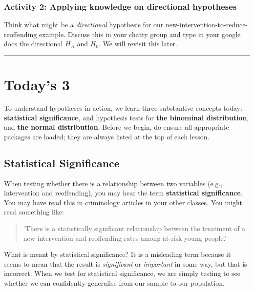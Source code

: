 \documentclass[
]{book}
\begin{document}
\hypertarget{activity-2-applying-knowledge-on-directional-hypotheses}{%
\subsubsection{Activity 2: Applying knowledge on directional hypotheses}\label{activity-2-applying-knowledge-on-directional-hypotheses}}

Think what might be a \emph{directional} hypothesis for our new-intervention-to-reduce-reoffending example. Discuss this in your chatty group and type in your google docs the directional \(H_A\) and \(H_0\). We will revisit this later.

\begin{center}\rule{0.5\linewidth}{0.5pt}\end{center}

\hypertarget{todays-3-3}{%
\section{Today's 3}\label{todays-3-3}}

To understand hypotheses in action, we learn three substantive concepts today: \textbf{statistical significance}, and hypothesis tests for \textbf{the binominal distribution}, and \textbf{the normal distribution}. Before we begin, do ensure all appropriate packages are loaded; they are always listed at the top of each lesson.

\hypertarget{statistical-significance}{%
\subsection{Statistical Significance}\label{statistical-significance}}

When testing whether there is a relationship between two variables (e.g., intervention and reoffending), you may hear the term \textbf{statistical significance}. You may have read this in criminology articles in your other classes. You might read something like:

\begin{quote}
`There is a statistically significant relationship between the treatment of a new intervention and reoffending rates among at-risk young people.'
\end{quote}

What is meant by statistical significance? It is a misleading term because it seems to mean that the result is \emph{significant} or \emph{important} in some way, but that is incorrect. When we test for statistical significance, we are simply testing to see whether we can confidently generalise from our sample to our population.
\end{document}
